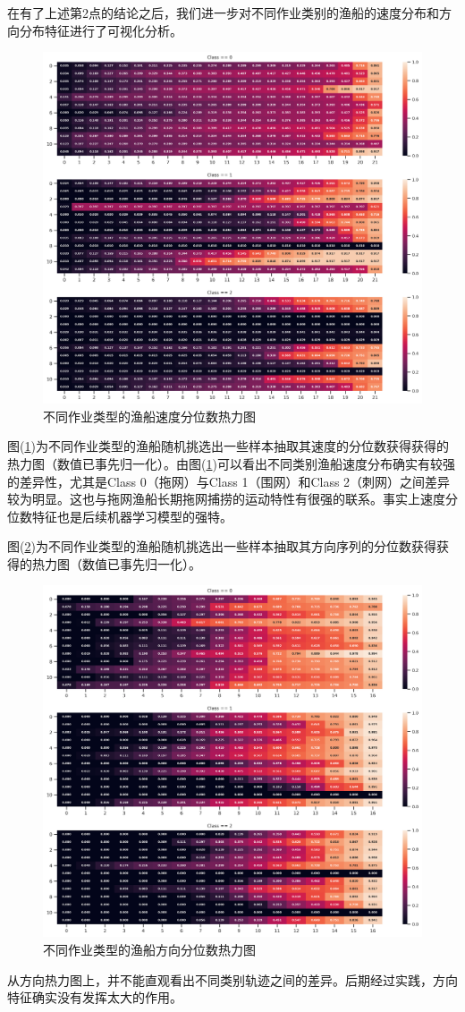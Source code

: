 \documentclass[UTF8, 12pt]{ctexart}
\begin{document}
	在有了上述第2点的结论之后，我们进一步对不同作业类别的渔船的速度分布和方向分布特征进行了可视化分析。
	\begin{figure}[H]
		\centering
		\includegraphics[width=0.45\linewidth]{..//plots//feature_speed_quantile_heatmap.png}
		\caption{不同作业类型的渔船速度分位数热力图}
		\label{sec_1_fig_4}
		\vspace{-0.2cm}
	\end{figure}
	图(\ref{sec_1_fig_4})为不同作业类型的渔船随机挑选出一些样本抽取其速度的分位数获得获得的热力图（数值已事先归一化）。由图(\ref{sec_1_fig_4})可以看出不同类别渔船速度分布确实有较强的差异性，尤其是Class 0（拖网）与Class 1（围网）和Class 2（刺网）之间差异较为明显。这也与拖网渔船长期拖网捕捞的运动特性有很强的联系。事实上速度分位数特征也是后续机器学习模型的强特。

	图(\ref{sec_1_fig_5})为不同作业类型的渔船随机挑选出一些样本抽取其方向序列的分位数获得获得的热力图（数值已事先归一化）。
	\begin{figure}[H]
		\centering
		\includegraphics[width=0.45\linewidth]{..//plots//feature_dir_quantile_heatmap.png}
		\caption{不同作业类型的渔船方向分位数热力图}
		\label{sec_1_fig_5}
		\vspace{-0.2cm}
	\end{figure}
	从方向热力图上，并不能直观看出不同类别轨迹之间的差异。后期经过实践，方向特征确实没有发挥太大的作用。
\end{document}
